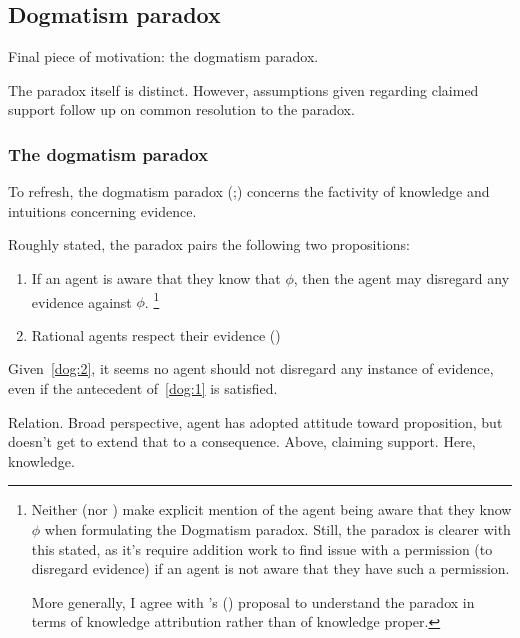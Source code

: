 \subsection{Dogmatism paradox}
\label{sec:dogmatism-paradox-wrt-assumption}

\begin{note}
  Final piece of motivation: the dogmatism paradox.

  The paradox itself is distinct.
  However, assumptions given regarding claimed support follow up on common resolution to the paradox.
\end{note}

\subsubsection{The dogmatism paradox}

\begin{note}
  To refresh, the dogmatism paradox (\cite[39,43--45]{Kripke:2011wv};\cite[148]{Harman:1973ww}) concerns the factivity of knowledge and intuitions concerning evidence.

  Roughly stated, the paradox pairs the following two propositions:
  \begin{enumerate}[label=D\arabic*., ref=(D\arabic*)]
  \item\label{dog:1} If an agent is aware that they know that \(\phi\), then the agent may disregard any evidence against \(\phi\).\nolinebreak
    \footnote{
      Neither \citeauthor{Kripke:2011wv} (nor \citeauthor{Harman:1973ww}) make explicit mention of the agent being aware that they know \(\phi\) when formulating the Dogmatism paradox.
      Still, the paradox is clearer with this stated, as it's require addition work to find issue with a permission (to disregard evidence) if an agent is not aware that they have such a permission.

      More generally, I agree with \citeauthor{Zhaoqing:2015vj}'s (\Citeyear{Zhaoqing:2015vj}) proposal to understand the paradox in terms of knowledge attribution rather than of knowledge proper.
    }
  \item\label{dog:2} Rational agents respect their evidence
    (\cite[Cf.][\S2]{Kelly:2016wk})
  \end{enumerate}
  Given~\ref{dog:2}, it seems no agent should not disregard any instance of evidence, even if the antecedent of~\ref{dog:1} is satisfied.
\end{note}

\begin{note}
  Relation.
  Broad perspective, agent has adopted attitude toward proposition, but doesn't get to extend that to a consequence.
  Above, claiming support.
  Here, knowledge.
\end{note}

